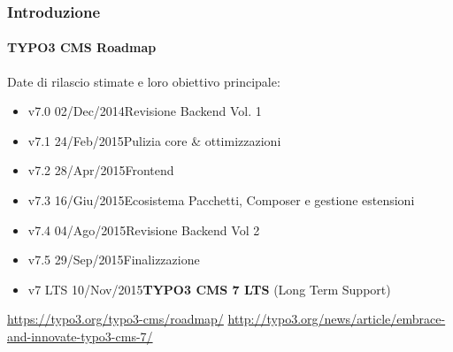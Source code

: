 \begin{frame}[fragile]
	\frametitle{Introduzione}
	\framesubtitle{TYPO3 CMS Roadmap}

	Date di rilascio stimate e loro obiettivo principale:

	\begin{itemize}
		\item v7.0 \tabto{1.1cm}02/Dec/2014\tabto{3.4cm}Revisione Backend Vol. 1
		\item v7.1 \tabto{1.1cm}24/Feb/2015\tabto{3.4cm}Pulizia core \& ottimizzazioni
		\item v7.2 \tabto{1.1cm}28/Apr/2015\tabto{3.4cm}Frontend
		\item v7.3 \tabto{1.1cm}16/Giu/2015\tabto{3.4cm}Ecosistema Pacchetti, Composer\newline
			\tabto{3.4cm}e gestione estensioni
		\item v7.4 \tabto{1.1cm}04/Ago/2015\tabto{3.4cm}Revisione Backend Vol 2
		\item v7.5 \tabto{1.1cm}29/Sep/2015\tabto{3.4cm}Finalizzazione

		\item
			\begingroup
				\color{typo3orange}
					v7 LTS \tabto{1.1cm}10/Nov/2015\tabto{3.4cm}\textbf{TYPO3 CMS 7 LTS} (Long Term Support)
			\endgroup

	\end{itemize}

	\smaller
		\url{https://typo3.org/typo3-cms/roadmap/}\newline
		\url{http://typo3.org/news/article/embrace-and-innovate-typo3-cms-7/}
	\normalsize

\end{frame}

